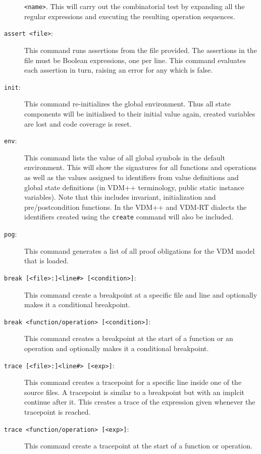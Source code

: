 \documentclass{overturerepchap}
\begin{document}
\begin{description}
  \texttt{<name>}. This will carry out the combinatorial
  test by expanding all the regular expressions and executing the resulting
  operation sequences. 
\item[\texttt{assert <file>}:] This command runs assertions from the
  file provided. The assertions in the file must be Boolean
  expressions, one per line. This command evaluates each assertion in
  turn, raising an error for any which is false.  
\item[\texttt{init}:] This command re-initializes the global
  environment. Thus all state components will be initialised to their
  initial value again, created variables are lost and code coverage
  is reset. 
\item[\texttt{env}:] This command lists the value of all global symbols
  in the default environment. This will show the signatures for all
  functions and operations as well as the values assigned to
  identifiers from value definitions and global state definitions (in VDM++
  terminology, public static instance variables). Note that this includes invariant,
  initialization and pre/postcondition functions. In the VDM++ and
  VDM-RT dialects the identifiers created using the \texttt{create}
  command will also be included. 
\item[\texttt{pog}:] This command generates a list of all proof
  obligations for the VDM model that is
  loaded.  
\item[\texttt{break [<file>:]<line\#> [<condition>]}:] This command
  create a breakpoint at a specific file and line and optionally makes
  it a conditional breakpoint.  
\item[\texttt{break <function/operation> [<condition>]}:] This command
  creates a breakpoint at the start of a function or an operation and
  optionally makes it a conditional breakpoint. 
\item[\texttt{trace [<file>:]<line\#> [<exp>]}:] This command creates a
  tracepoint for a specific line inside one of the source files. A
  tracepoint is similar to a breakpoint but with an implcit continue
  after it. This creates a trace of the expression given
  whenever the tracepoint is reached.  
\item[\texttt{trace <function/operation> [<exp>]}:] This command
  create a tracepoint at the start of a function or operation.

\end{description}
\end{document}
